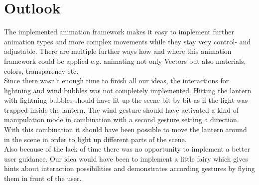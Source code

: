 \section{Outlook}

The implemented animation framework makes it easy to implement further animation types and more complex movements while they stay very control- and adjustable. There are multiple further ways how and where this animation framework could be applied e.g. animating not only Vectors but also materials, colors, transparency etc.\\

Since there wasn\rq{}t enough time to finish all our ideas, the interactions for lightning and wind bubbles was not completely implemented. Hitting the lantern with lightning bubbles should have lit up the scene bit by bit as if the light was trapped inside the lantern. The wind gesture should have activated a kind of manipulation mode in combination with a second gesture setting a direction. With this combination it should have been possible to move the lantern around in the scene in order to light up different parts of the scene.\\

Also because of the lack of time there was no opportunity to implement a better user guidance. Our idea would have been to implement a little fairy which gives hints about interaction possibilities and demonstrates according gestures by flying them in front of the user.